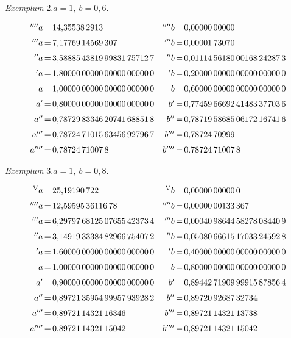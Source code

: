 \begin{center}\textit{Exemplum} 2.\quad $a=1,\ b=0{,}6$.\end{center}
\begingroup\small\setlength{\arraycolsep}{0pt}
\[\begin{array}{r@{\,=\,}l@{\quad}r@{\,=\,}l}
{}^{\prime\prime\prime\prime}a&14{,}35538\,2913&{}^{\prime\prime\prime\prime}b&0{,}00000\,00000\\[6pt]
{}^{\prime\prime\prime}a&7{,}17769\,14569\,307&{}^{\prime\prime\prime}b&0{,}00001\,73070\\[6pt]
{}^{\prime\prime}a&3{,}58885\,43819\,99831\,75712\,7&{}^{\prime\prime}b&0{,}01114\,56180\,00168\,24287\,3\\[6pt]
{}^{\prime}a&1{,}80000\,00000\,00000\,00000\,0&{}^{\prime}b&0{,}20000\,00000\,00000\,00000\,0\\[6pt]
a&1{,}00000\,00000\,00000\,00000\,0&b&0{,}60000\,00000\,00000\,00000\,0\\[6pt]
a'&0{,}80000\,00000\,00000\,00000\,0&b'&0{,}77459\,66692\,41483\,37703\,6\\[6pt]
a''&0{,}78729\,83346\,20741\,68851\,8&b''&0{,}78719\,58685\,06172\,16741\,6\\[6pt]
a'''&0{,}78724\,71015\,63456\,92796\,7&b'''&0{,}78724\,70999\\[6pt]
a''''&0{,}78724\,71007\,8&b''''&0.78724\,71007\,8
\end{array}
\]\endgroup
{}
\begin{center}\textit{Exemplum} 3.\quad $a=1,\ b=0{,}8$.\end{center}
\begingroup\small\setlength{\arraycolsep}{0pt}
\[\begin{array}{r@{\,=\,}l@{\quad}r@{\,=\,}l}
{}^{\mathrm V}a&25{,}19190\,722&{}^{\mathrm V}b&0{,}00000\,00000\,0\\[6pt]
{}^{\prime\prime\prime\prime}a&12{,}59595\,36116\,78&{}^{\prime\prime\prime\prime}b&0{,}00000\,00133\,367\\[6pt]
{}^{\prime\prime\prime}a&6{,}29797\,68125\,07655\,42373\,4&{}^{\prime\prime\prime}b&0{,}00040\,98644\,58278\,08440\,9\\[6pt]
{}^{\prime\prime}a&3{,}14919\,33384\,82966\,75407\,2&{}^{\prime\prime}b&0{,}05080\,66615\,17033\,24592\,8\\[6pt]
{}^{\prime}a&1{,}60000\,00000\,00000\,00000\,0&{}^{\prime}b&0{,}40000\,00000\,00000\,00000\,0\\[6pt]
a&1{,}00000\,00000\,00000\,00000\,0&b&0{,}80000\,00000\,00000\,00000\,0\\[6pt]
a'&0{,}90000\,00000\,00000\,00000\,0&b'&0{,}89442\,71909\,99915\,87856\,4\\[6pt]
a''&0{,}89721\,35954\,99957\,93928\,2&b''&0{,}89720\,92687\,32734\\[6pt]
a'''&0{,}89721\,14321\,16346&b'''&0{,}89721\,14321\,13738\\[6pt]
a''''&0{,}89721\,14321\,15042&b''''&0{,}89721\,14321\,15042
\end{array}
\]\endgroup

